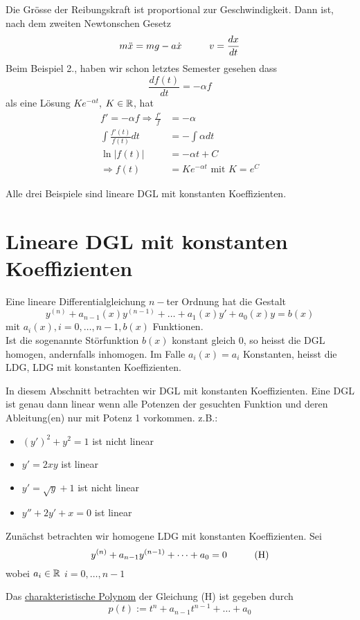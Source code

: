\begin{enumerate}
Die Grösse der Reibungskraft ist proportional zur Geschwindigkeit. Dann ist, nach dem zweiten Newtonschen Gesetz \[m\ddot x = mg - a\dot x\text{\hspace{10mm}}v=\frac{dx}{dt}\]
Beim Beispiel 2., haben wir schon letztes Semester gesehen dass \[\frac{df(t)}{dt}=-\alpha f\] als eine Lösung $Ke^{-\alpha t}$, $K\in\mathbb{R}$, hat
\begin{align*}
f'=-\alpha f\Rightarrow \frac{f'}{f}&=-\alpha\\
\int{\frac{f'(t)}{f(t)}dt}&=-\int{\alpha dt}\\
\ln\left| f(t)\right|&=-\alpha t+C\\
\Rightarrow f(t)&=Ke^{-\alpha t}\text{ mit }K={e^C}
\end{align*}

\end{enumerate}
Alle drei Beispiele sind lineare DGL mit konstanten Koeffizienten.
\section{Lineare DGL mit konstanten Koeffizienten}

\begin{definition}{7.1}
Eine lineare Differentialgleichung $n-$ter Ordnung hat die Gestalt \[{y^{(n)}} + {a_{n - 1}}(x){y^{(n - 1)}} +  \ldots  + {a_1}(x)y' + {a_0}(x)y = b(x)\] mit $a_i(x),i=0,\dots,n-1, b(x)$ Funktionen. \\

Ist die sogenannte Störfunktion $b(x)$ konstant gleich 0, so heisst die DGL homogen, andernfalls inhomogen. Im Falle $a_i(x)=a_i$ Konstanten, heisst die LDG, LDG mit konstanten Koeffizienten.
\end{definition}

In diesem Abschnitt betrachten wir DGL mit konstanten Koeffizienten. Eine DGL ist genau dann linear wenn alle Potenzen der gesuchten Funktion und deren Ableitung(en) nur mit Potenz 1 vorkommen.
z.B.:
\begin{itemize}
\item $\left( y'\right)^2+y^2=1$ ist nicht linear
\item $y'=2xy$ ist linear
\item $y'=\sqrt{y}+1$ ist nicht linear
\item $y''+2y'+x=0$ ist linear
\end{itemize}

\noindent Zunächst betrachten wir homogene LDG mit konstanten Koeffizienten. Sei \[y^{(n)}+a_{n-1}y^{(n-1)}+\dots+a_0=0\text{\hspace{10mm}(H)}\] wobei $a_i\in\mathbb{R}$ $i=0,\dots,n-1$
\begin{definition}{7.2}
Das \underline{charakteristische Polynom} der Gleichung (H) ist gegeben durch \[p(t):=t^n+a_{n-1}t^{n-1}+\dots+a_0\]
\end{definition}
